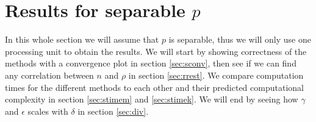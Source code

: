 \chapter{Results for separable $p$}%
In this whole section we will assume that $p$ is separable, thus we will only use one processing unit to obtain the results. 
We will start by showing correctness of the methods with a convergence plot in section \ref{sec:sconv}, then see if we can find any correlation between $n$ and $\rho$ in section \ref{sec:rrest}.
We compare computation times for the different methods to each other and their predicted computational complexity in section \ref{sec:stimem} and \ref{sec:stimek}.
We will end by seeing how $\gamma$ and $\epsilon$ scales with $\delta$ in section \ref{sec:div}.

